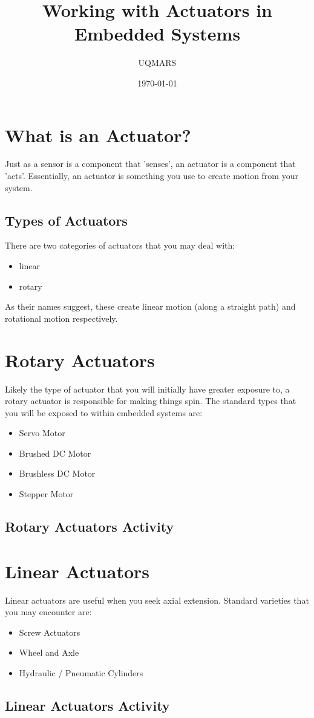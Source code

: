 \documentclass{article}
\title{Working with Actuators in Embedded Systems}
\author{UQMARS}
\date{\today}
\begin{document}
\maketitle
\pagebreak

\section*{What is an Actuator?}
Just as a sensor is a component that 'senses', an actuator is a component that 'acts'. Essentially, an actuator is something you use to create motion from your system.
\subsection*{Types of Actuators}
There are two categories of actuators that you may deal with:
\begin{itemize}
    \item linear
    \item rotary
\end{itemize}
As their names suggest, these create linear motion (along a straight path) and rotational motion respectively.

\section*{Rotary Actuators}
Likely the type of actuator that you will initially have greater exposure to, a rotary actuator is responsible for making things spin. The standard types that you will be exposed to within embedded systems are:
\begin{itemize}
    \item Servo Motor
    \item Brushed DC Motor
    \item Brushless DC Motor
    \item Stepper Motor
\end{itemize}

\subsection*{Rotary Actuators Activity}

\section*{Linear Actuators}
Linear actuators are useful when you seek axial extension. Standard varieties that you may encounter are:
\begin{itemize}
    \item Screw Actuators
    \item Wheel and Axle
    \item Hydraulic / Pneumatic Cylinders
\end{itemize}

\subsection*{Linear Actuators Activity}
\end{document}
